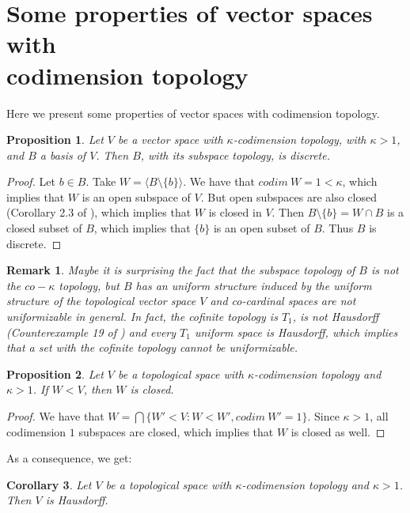 \documentclass[a4paper,12pt]{article}
\newtheorem{prop}{Proposition}[section]
\newtheorem{obs}{Remark}[section]
\newtheorem{cor}[prop]{Corollary}
\theoremstyle{bloco}
\begin{document}
\section{Some properties of vector spaces with \\ codimension topology}

Here we present some properties of vector spaces with codimension topology.

\begin{prop}Let $V$ be a vector space with $\kappa$-codimension topology, with $\kappa > 1$, and $B$ a basis of $V$. Then $B$, with its subspace topology, is discrete.
\end{prop}

\begin{proof}Let $b \in B$. Take $W = \langle B \setminus \{b\}\rangle$. We have that $codim \ W = 1 < \kappa$, which implies that $W$ is an open subspace of $V$. But open subspaces are also closed (Corollary 2.3 of \cite{Wa}), which implies that $W$ is closed in $V$. Then $B \setminus \{b\} = W \cap B$ is a closed subset of $B$, which implies that $\{b\}$ is an open subset of $B$. Thus $B$ is discrete. 
\end{proof}

\begin{obs}Maybe it is surprising the fact that the subspace topology of $B$ is not the $co-\kappa$ topology, but $B$ has an uniform structure induced by the uniform structure of the topological vector space $V$ and co-cardinal spaces are not uniformizable in general.  In fact, the cofinite topology is $T_{1}$, is not Hausdorff (Counterexample 19 of \cite{SS}) and every $T_{1}$ uniform space is Hausdorff, which implies that a set with the cofinite topology cannot be uniformizable.
\end{obs}

\begin{prop}Let $V$ be a topological space with $\kappa$-codimension topology and $\kappa > 1$. If $W < V$, then $W$ is closed.
\end{prop}

\begin{proof}We have that $W = \bigcap \{W' < V: W < W', codim \ W' = 1\}$. Since $\kappa > 1$, all codimension $1$ subspaces are closed, which implies that $W$ is closed as well.
\end{proof}

As a consequence, we get:

\begin{cor}Let $V$ be a topological space with $\kappa$-codimension topology and $\kappa > 1$. Then $V$ is Hausdorff.
\end{cor}
\end{document}
